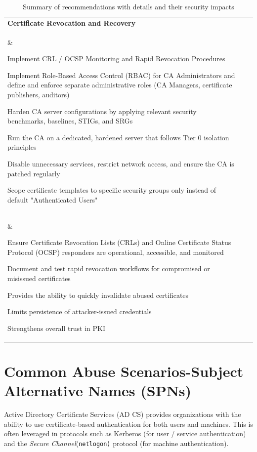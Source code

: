 {\begin{table}[htbp]
\begin{tabular}{|p{3.5cm}|p{6cm}|p{6cm}|}
\textbf{Certificate Revocation and Recovery} \\\& 
\begin{compactitem}
    \item Implement CRL / OCSP Monitoring and Rapid Revocation Procedures
    \item Implement Role-Based Access Control (RBAC) for CA Administrators and define and enforce separate administrative roles (CA Managers, certificate publishers, auditors)
    \item Harden CA server configurations by applying relevant security benchmarks, baselines, STIGs, and SRGs
    \item Run the CA on a dedicated, hardened server that follows Tier 0 isolation principles
    \item Disable unnecessary services, restrict network access, and ensure the CA is patched regularly
    \item Scope certificate templates to specific security groups only instead of default "Authenticated Users"
\end{compactitem} \\\& 
\begin{compactitem}
    \item Ensure Certificate Revocation Lists (CRLs) and Online Certificate Status Protocol (OCSP) responders are operational, accessible, and monitored
    \item Document and test rapid revocation workflows for compromised or misissued certificates
\end{compactitem} 
\begin{compactitem}
    \item Provides the ability to quickly invalidate abused certificates
    \item Limits persistence of attacker-issued credentials
    \item Strengthens overall trust in PKI
\end{compactitem} \\
\hline

\end{tabular}
\caption{Summary of recommendations with details and their security impacts}
\end{table}

\section{Common Abuse Scenarios-Subject Alternative Names (SPNs)}
Active Directory Certificate Services (AD CS) provides organizations with the ability to use certificate-based authentication for both users and machines. This is often leveraged in protocols such as Kerberos (for user / service authentication) and the \textit{Secure Channel}(\texttt{netlogon)} protocol (for machine authentication).

}
